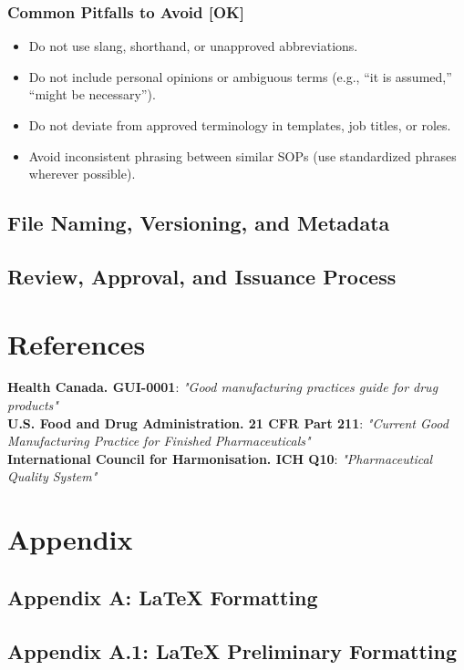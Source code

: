 \documentclass[11pt]{article}
\begin{document}
\subsubsection{Common Pitfalls to Avoid [OK]}
\begin{itemize}
    \item Do not use slang, shorthand, or unapproved abbreviations.
    \item Do not include personal opinions or ambiguous terms (e.g., “it is assumed,” “might be necessary”).
    \item Do not deviate from approved terminology in templates, job titles, or roles.
    \item Avoid inconsistent phrasing between similar SOPs (use standardized phrases wherever possible).
\end{itemize}

\subsection{File Naming, Versioning, and Metadata}
\subsection{Review, Approval, and Issuance Process}

\section{References}
    \textbf{Health Canada. GUI-0001}: \textit{"Good manufacturing practices guide for drug products"}\\[0.2cm]
    \textbf{U.S. Food and Drug Administration. 21 CFR Part 211}: \textit{"Current Good Manufacturing Practice for Finished Pharmaceuticals"}\\[0.2cm]
    \textbf{International Council for Harmonisation. ICH Q10}: \textit{"Pharmaceutical Quality System"}\\[0.2cm]

\section{Appendix}
\subsection*{Appendix A: LaTeX Formatting}

\subsection*{Appendix A.1: LaTeX Preliminary Formatting}
\end{document}
